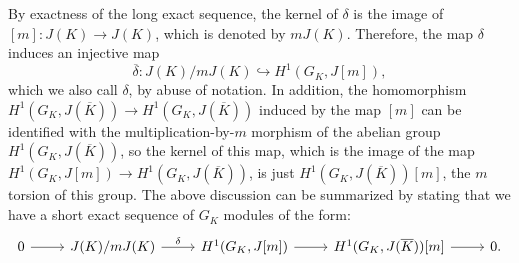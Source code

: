 \documentclass[a4paper, 12pt]{amsart}
\theoremstyle{definition}
\theoremstyle{plain}
\theoremstyle{plain}
\theoremstyle{plain}
\theoremstyle{plain}
\theoremstyle{remark}
\theoremstyle{remark}
\theoremstyle{plain}
\begin{document}
By exactness of the long exact sequence, the kernel of $\delta$ is the image of $[m]:J(K)\rightarrow J(K)$, which is denoted by $mJ(K)$. Therefore, the map $\delta$ induces an injective map 
\begin{equation*}
	\overline{\delta}:J(K)/mJ(K)\hookrightarrow H^1(G_K,J[m]),
\end{equation*}
which we also call $\delta$, by abuse of notation. In addition, the homomorphism $H^1(G_K,J(\overline{K}))\rightarrow H^1(G_K,J(\overline{K}))$ induced by the map $[m]$ can be identified with the multiplication-by-$m$ morphism of the abelian group $H^1(G_K,J(\overline{K}))$, so the kernel of this map, which is the image of the map $H^1(G_K,J[m])\rightarrow H^1(G_K,J(\overline{K}))$, is just $H^1(G_K,J(\overline{K}))[m]$, the $m$ torsion of this group. The above discussion can be summarized by stating that we have a short exact sequence of $G_K$ modules of the form:
\begin{equation}\label{funses}
	\begin{tikzcd}
		0\arrow{r}
		&J(K)/mJ(K)\arrow{r}{\delta}
		&H^1(G_K,J[m])\arrow{r}
		&H^1(G_K,J(\overline{K}))[m]\arrow{r}
		&0.
	\end{tikzcd}
\end{equation}
\end{document}
